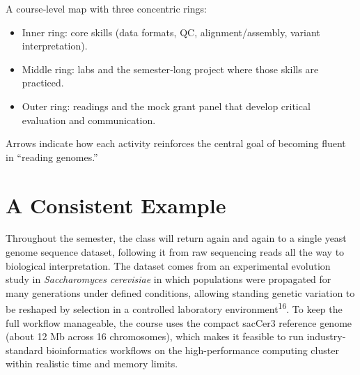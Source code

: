 \documentclass[
  letterpaper,
  DIV=11,
  numbers=noendperiod]{scrreprt}
\providecommand{\tightlist}{%
  \setlength{\itemsep}{0pt}\setlength{\parskip}{0pt}}
\begin{document}
\begin{tcolorbox}[enhanced jigsaw, toptitle=1mm, arc=.35mm, toprule=.15mm, colframe=quarto-callout-note-color-frame, opacitybacktitle=0.6, breakable, left=2mm, titlerule=0mm, bottomtitle=1mm, rightrule=.15mm, title=\textcolor{quarto-callout-note-color}{\faInfo}\hspace{0.5em}{Figure 1.5 -- How course components fit together}, opacityback=0, colbacktitle=quarto-callout-note-color!10!white, leftrule=.75mm, coltitle=black, bottomrule=.15mm, colback=white]

A course‑level map with three concentric rings:

\begin{itemize}
\tightlist
\item
  Inner ring: core skills (data formats, QC, alignment/assembly, variant
  interpretation).\\
\item
  Middle ring: labs and the semester‑long project where those skills are
  practiced.\\
\item
  Outer ring: readings and the mock grant panel that develop critical
  evaluation and communication.
\end{itemize}

Arrows indicate how each activity reinforces the central goal of
becoming fluent in ``reading genomes.''

\end{tcolorbox}

\section{A Consistent Example}\label{a-consistent-example}

Throughout the semester, the class will return again and again to a
single yeast genome sequence dataset, following it from raw sequencing
reads all the way to biological interpretation. The dataset comes from
an experimental evolution study in \emph{Saccharomyces cerevisiae} in
which populations were propagated for many generations under defined
conditions, allowing standing genetic variation to be reshaped by
selection in a controlled laboratory environment\textsuperscript{16}. To
keep the full workflow manageable, the course uses the compact sacCer3
reference genome (about 12 Mb across 16 chromosomes), which makes it
feasible to run industry-standard bioinformatics workflows on the
high-performance computing cluster within realistic time and memory
limits.
\end{document}
